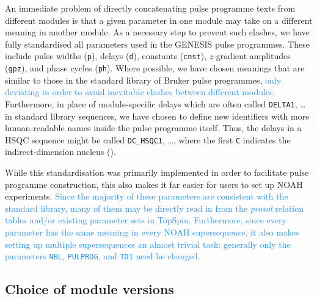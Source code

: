 \documentclass[a4paper,11pt]{article}
\newcommand{\proton}{\ch{^{1}H}}
\newcommand{\carbon}{\ch{^{13}C}}
\newcommand{\nitrogen}{\ch{^{15}N}}
\newcommand{\HC}{\proton{}--\carbon{}}
\newcommand{\HN}{\proton{}--\nitrogen{}}
\newcommand{\changed}[1]{\textcolor{DodgerBlue}{#1}}
\newcommand{\onejxh}{{}^1\!J_{\ch{XH}}}
\begin{document}
\begin{refsection}
An immediate problem of directly concatenating pulse programme texts from different modules is that a given parameter in one module may take on a different meaning in another module.
As a necessary step to prevent such clashes, we have fully standardised all parameters used in the GENESIS pulse programmes.
These include pulse widths (\texttt{p}), delays (\texttt{d}), constants (\texttt{cnst}), \(z\)-gradient amplitudes (\texttt{gpz}), and phase cycles (\texttt{ph}).
Where possible, we have chosen meanings that are similar to those in the standard library of Bruker pulse programmes, \changed{only deviating in order to avoid inevitable clashes between different modules.}
Furthermore, in place of module-specific delays which are often called \texttt{DELTA1}, \ldots{} in standard library sequences, we have chosen to define new identifiers with more human-readable names inside the pulse programme itself.
Thus, the delays in a HSQC sequence might be called \texttt{DC\_HSQC1}, \ldots{}, where the first \texttt{C} indicates the indirect-dimension nucleus (\carbon{}).

While this standardisation was primarily implemented in order to facilitate pulse programme construction, this also makes it far easier for users to set up NOAH experiments.
\changed{
    Since the majority of these parameters are consistent with the standard library, many of them may be directly read in from the \textit{prosol} relation tables and/or existing parameter sets in TopSpin.
    Furthermore, since every parameter has the same meaning in every NOAH supersequence, it also makes setting up multiple supersequences an almost trivial task: generally only the parameters \texttt{NBL}, \texttt{PULPROG}, and \texttt{TD1} need be changed.
}

\subsection{Choice of module versions}


\end{refsection}
\end{document}

